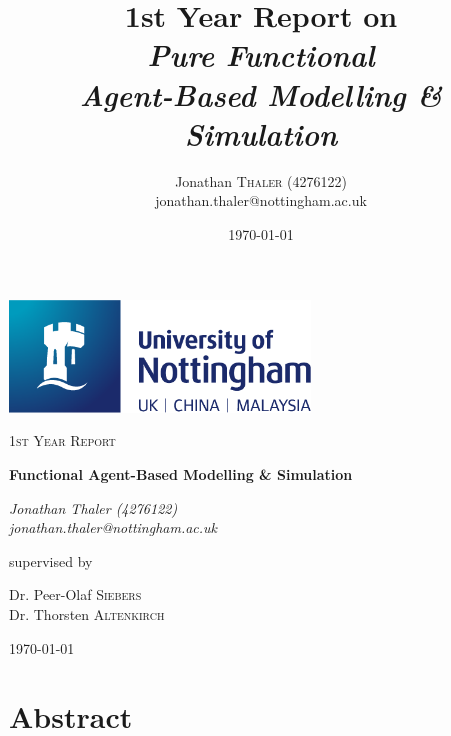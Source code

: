 \documentclass[oneside]{book}
\title{\small{1st Year Report on} \\ \textit{Pure Functional \\ Agent-Based Modelling \& Simulation}} %
\author{Jonathan \textsc{Thaler} (4276122) \\ jonathan.thaler@nottingham.ac.uk } %
\date{\today} %
\begin{document}

\begin{titlepage}
	\centering
	\includegraphics[width=0.60\textwidth]{./logo/UoN_Primary_Logo_RGB.png}\par\vspace{1cm}
	{\scshape\Large 1st Year Report\par}
	\vspace{1.5cm}
	{\huge\bfseries Functional Agent-Based Modelling \& Simulation\par}
	\vspace{2cm}
	{\Large\itshape Jonathan Thaler (4276122) \\ jonathan.thaler@nottingham.ac.uk \par}
	\vfill
	supervised by\par
	Dr. Peer-Olaf \textsc{Siebers} \\
	Dr. Thorsten \textsc{Altenkirch}

	\vfill

	{\large \today\par}
\end{titlepage}


\cleardoublepage
\section*{Abstract}
\end{document}
